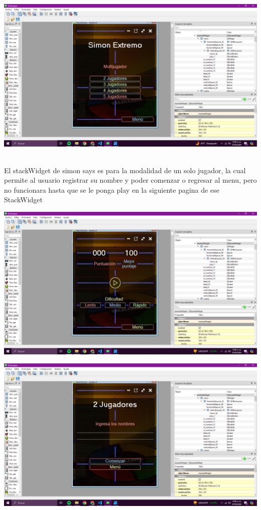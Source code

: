 \documentclass{article}
\begin{document}
\vspace{0.2cm}


\includegraphics[width=1\linewidth]{Captura de pantalla (756).png}

\vspace{0.2cm}
{\Large \\ El stackWidget de simon says es para la modalidad de un solo jugador, la cual permite al usuario registrar su nombre y poder comenzar o regresar al menu, pero no funcionara hasta que se le ponga play en la siguiente pagina de ese StackWidget

} 


\newpage

\vspace{0.2cm}
\includegraphics[width=1\linewidth]{Captura de pantalla (757).png}

\vspace{0.2cm}


\includegraphics[width=1\linewidth]{Captura de pantalla (758).png}
\end{document}
